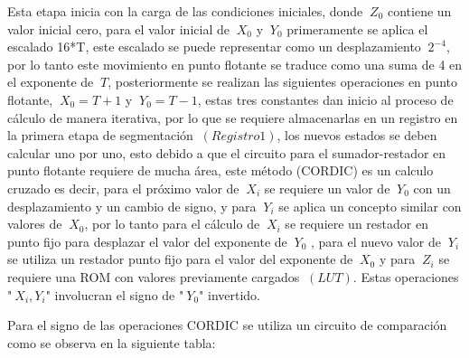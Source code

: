 Esta etapa inicia con la carga de las condiciones iniciales, donde $\ Z_0 $ contiene un valor inicial cero, para el valor inicial de $\ X_0 $ y $\ Y_0 $ primeramente se aplica el escalado  16*T,
este escalado se puede representar como un desplazamiento $\ 2^{-4} $, por lo tanto este movimiento en punto flotante se traduce como una suma de 4 en el exponente de $\ T$, posteriormente se realizan las siguientes operaciones en punto flotante,  $\ X_0 = T + 1 $ y $\ Y_0 = T - 1 $, estas tres constantes dan inicio al proceso de cálculo de manera iterativa, por lo que se requiere almacenarlas en un registro en la primera etapa de segmentación $\ \left(Registro 1 \right) $, los nuevos estados se deben calcular uno por uno, esto debido a que el circuito para el sumador-restador en punto flotante requiere de mucha área, este método (CORDIC) es un calculo cruzado es decir, para el próximo valor de $\ X_i$ se requiere un valor de $\ Y_0 $ con un desplazamiento y un cambio de signo, y para $\ Y_i $ se aplica un concepto similar con valores de $\ X_0$,  por lo tanto para el cálculo de $\ X_i $ se requiere un restador en punto fijo para desplazar el valor del exponente de $\ Y_0 $ , para el nuevo valor de $\ Y_i $ se utiliza un restador punto fijo para el valor del exponente de $\ X_0 $ y para $\ Z_i $ se requiere una ROM con valores previamente cargados $\ \left(LUT \right) $. Estas operaciones "$\ X_i , Y_i $"  involucran el signo de "$\ Y_0 $" invertido.

Para el signo de las operaciones CORDIC se utiliza un circuito de comparación como se observa en la siguiente tabla: 


